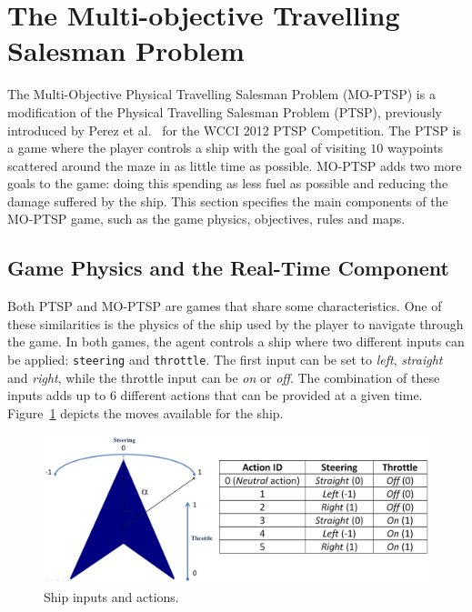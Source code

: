 \documentclass[conference]{IEEEtran}
\begin{document}
\section{The Multi-objective Travelling Salesman Problem} \label{sec:moptsp}

The Multi-Objective Physical Travelling Salesman Problem (MO-PTSP) is a modification of the Physical Travelling Salesman Problem (PTSP), previously introduced by Perez et al.~\cite{PerezCEC2012} for the WCCI 2012 PTSP Competition. The PTSP is a game where the player controls a ship with the goal of visiting $10$ waypoints scattered around the maze in as little time as possible. MO-PTSP adds two more goals to the game: doing this spending as less fuel as possible and reducing the damage suffered by the ship. This section specifies the main components of the MO-PTSP game, such as the game physics, objectives, rules and maps. 

\subsection{Game Physics and the Real-Time Component}

Both PTSP and MO-PTSP are games that share some characteristics. One of these similarities is the physics of the ship used by the player to navigate through the game. In both games, the agent controls a ship where two different inputs can be applied: \texttt{steering} and \texttt{throttle}. The first input can be set to \textit{left}, \textit{straight} and \textit{right}, while the throttle input can be \textit{on} or \textit{off}. The combination of these inputs adds up to $6$ different actions that can be provided at a given time. Figure~\ref{fig:ship} depicts the moves available for the ship.

\begin{figure} [!h]
	\begin{center}
	\includegraphics[scale=0.14]{img/ShipActions}
	\caption{Ship inputs and actions.}
	\label{fig:ship}
	\end{center}
\end{figure}
\end{document}
